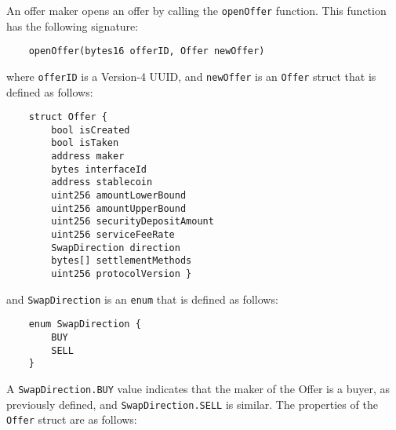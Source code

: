 \documentclass[11pt]{article}
\begin{document}
    An offer maker opens an offer by calling the \verb|openOffer| function.
    This function has the following signature:
    \begin{verbatim}
    openOffer(bytes16 offerID, Offer newOffer)
    \end{verbatim}
    where \verb|offerID| is a Version-4 UUID\cite{UUID}, and \verb|newOffer| is an \verb|Offer|
    struct that is defined as follows:
    \begin{verbatim}
    struct Offer {
        bool isCreated
        bool isTaken
        address maker
        bytes interfaceId
        address stablecoin
        uint256 amountLowerBound
        uint256 amountUpperBound
        uint256 securityDepositAmount
        uint256 serviceFeeRate
        SwapDirection direction
        bytes[] settlementMethods
        uint256 protocolVersion }
    \end{verbatim}
    and \verb|SwapDirection| is an \verb|enum| that is defined as follows:
    \begin{verbatim}
    enum SwapDirection {
        BUY
        SELL
    }
    \end{verbatim}
    A \verb|SwapDirection.BUY| value indicates that the maker of the Offer is a buyer, as previously
    defined, and \verb|SwapDirection.SELL| is similar.
    The properties of the \verb|Offer| struct are as follows: \\
\end{document}
